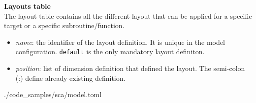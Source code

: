 \textbf{Layouts table}\\
The layout table contains all the different layout that can be applied for a 
specific target or a specific subroutine/function.
\begin{itemize}
  \item \textit{name}: the identifier of the layout definition. It is unique in 
        the model configuration. \lstinline|default| is the only mandatory 
        layout definiton.
  \item \textit{position}: list of dimension definition that defined the layout. 
        The semi-colon (:) define already existing definition.
\end{itemize}


      {./code_samples/sca/model.toml}
